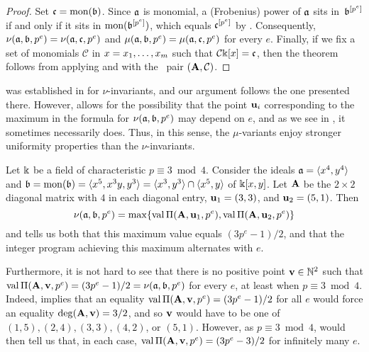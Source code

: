 \documentclass{article}
\begin{document}
\begin{proof} 
   Set $\mathfrak{c} = \operatorname{mon}(\mathfrak{b})$.  Since $\mathfrak{a}$ is monomial, a (Frobenius) power of $\mathfrak{a}$ sits in~$\mathfrak{b}^{[p^e]}$ if and only if it sits in $\operatorname{mon}(\mathfrak{b}^{[p^e]})$, which equals $\mathfrak{c}^{[p^e]}$ by .  Consequently, $\nu(\mathfrak{a}, \mathfrak{b}, p^e) = \nu(\mathfrak{a}, \mathfrak{c}, p^e)$ and $\mu(\mathfrak{a}, \mathfrak{b}, p^e) = \mu(\mathfrak{a}, \mathfrak{c}, p^e)$ for every $e$.  Finally, if we fix a set of monomials $\mathcal{C}$ in $x = x_1, \ldots, x_m$ such that $\mathcal{C} \Bbbk[x] = \mathfrak{c}$, then the theorem follows from applying  and  with the \compatible\ pair $(\mathbf{A}, \mathcal{C})$.
   \end{proof}

 was established in \cite[Section~4]{budur+mustata+saito.roots_bs_polys_monomial} for $\nu$-invariants, and our argument follows the one presented there.  However,  allows for the possibility that the point $\mathbf{u}_i$ corresponding to the maximum in the formula for $\nu(\mathfrak{a}, \mathfrak{b}, p^e)$ may  depend on $e$, and as we see in , it sometimes necessarily does.  Thus, in this sense, the $\mu$-variants enjoy stronger uniformity properties than the $\nu$-invariants.


\begin{example} 
\label{less uniformity for nu: E}
Let $\Bbbk$ be a field of characteristic $p \equiv 3 \bmod 4$. Consider the ideals $\mathfrak{a} = \langle x^4, y^4 \rangle$ and $\mathfrak{b} = \operatorname{mon}(\mathfrak{b}) = \langle x^5, x^3 y, y^3 \rangle = \langle x^3, y^3 \rangle \cap \langle x^5, y \rangle$ of $\Bbbk[x,y]$.  Let $\mathbf{A}$ be the $2 \times 2$ diagonal matrix with $4$ in each diagonal entry, $\mathbf{u}_1=(3,3)$, and $\mathbf{u}_2=(5,1)$.  
Then 
\[ \nu(\mathfrak{a}, \mathfrak{b}, p^e) = \max \{ \operatorname{val} \Pi(\mathbf{A},\mathbf{u}_1, p^e), \operatorname{val} \Pi(\mathbf{A}, \mathbf{u}_2, p^e) \} \] and  tells us both that this maximum value equals $(3p^e-1)/2$, and that the integer program achieving this maximum alternates with $e$.

Furthermore, it is not hard to see that there is no positive point $\mathbf{v} \in \mathbb{N}^2$ such that $\operatorname{val} \Pi(\mathbf{A}, \mathbf{v}, p^e) = (3p^e-1)/2 = \nu(\mathfrak{a}, \mathfrak{b}, p^e)$ for every $e$, at least when $p \equiv 3 \bmod 4$.  Indeed,  implies that an equality $\operatorname{val} \Pi(\mathbf{A}, \mathbf{v}, p^e) = (3p^e-1)/2$ for all $e$ would force an equality $\operatorname{deg}(\mathbf{A},\mathbf{v}) = 3/2$, and so $\mathbf{v}$ would have to be one of $(1,5), (2,4), (3,3), (4,2)$, or $(5,1)$.  However, as $p \equiv 3 \bmod 4$,     would then tell us that, in each case, $\operatorname{val} \Pi(\mathbf{A}, \mathbf{v}, p^e) = (3p^e-3)/2$ for infinitely many $e$.
\end{example}
 
\end{document}
